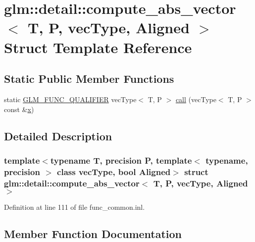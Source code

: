 \hypertarget{structglm_1_1detail_1_1compute__abs__vector}{}\section{glm\+::detail\+::compute\+\_\+abs\+\_\+vector$<$ T, P, vec\+Type, Aligned $>$ Struct Template Reference}
\label{structglm_1_1detail_1_1compute__abs__vector}
\subsection*{Static Public Member Functions}
\begin{DoxyCompactItemize}
\item 
static \mbox{\hyperlink{setup_8hpp_a33fdea6f91c5f834105f7415e2a64407}{G\+L\+M\+\_\+\+F\+U\+N\+C\+\_\+\+Q\+U\+A\+L\+I\+F\+I\+ER}} vec\+Type$<$ T, P $>$ \mbox{\hyperlink{structglm_1_1detail_1_1compute__abs__vector_aec6dd5547933aa5379efb141041eba76}{call}} (vec\+Type$<$ T, P $>$ const \&\mbox{\hyperlink{glad_8h_a92d0386e5c19fb81ea88c9f99644ab1d}{x}})
\end{DoxyCompactItemize}


\subsection{Detailed Description}
\subsubsection*{template$<$typename T, precision P, template$<$ typename, precision $>$ class vec\+Type, bool Aligned$>$\newline
struct glm\+::detail\+::compute\+\_\+abs\+\_\+vector$<$ T, P, vec\+Type, Aligned $>$}



Definition at line 111 of file func\+\_\+common.\+inl.



\subsection{Member Function Documentation}
\mbox{\label{structglm_1_1detail_1_1compute__abs__vector_aec6dd5547933aa5379efb141041eba76}} 
